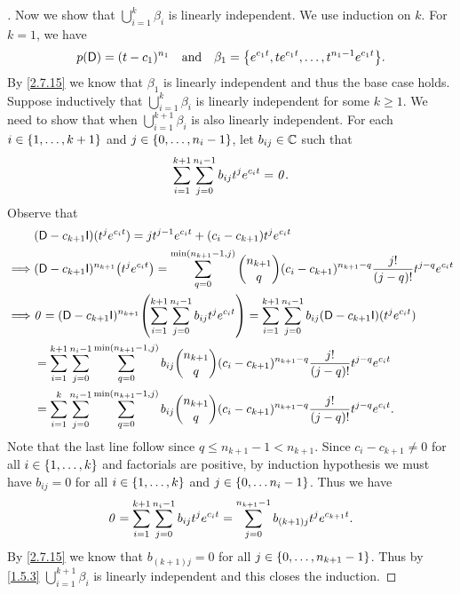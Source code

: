 \begin{proof}[]
	Now we show that \(\bigcup_{i = 1}^k \beta_i\) is linearly independent.
	We use induction on \(k\).
	For \(k = 1\), we have
	\[
		p(\Dop) = (t - c_1)^{n_1} \quad \text{and} \quad \beta_1 = \set{e^{c_1 t}, t e^{c_1 t}, \dots, t^{n_1 - 1} e^{c_1 t}}.
	\]
	By \cref{2.7.15} we know that \(\beta_1\) is linearly independent and thus the base case holds.
	Suppose inductively that \(\bigcup_{i = 1}^k \beta_i\) is linearly independent for some \(k \geq 1\).
	We need to show that when \(\bigcup_{i = 1}^{k + 1} \beta_i\) is also linearly independent.
	For each \(i \in \left\lbrace1, \dots, k + 1\right\rbrace\) and \(j \in \left\lbrace0, \dots, n_i - 1\right\rbrace\), let \(b_{i j} \in \mathbb{C}\) such that
	\[
		\sum_{i = 1}^{k + 1} \sum_{j = 0}^{n_i - 1} b_{i j} t^j e^{c_i t} = \mathit{0}.
	\]
	Observe that
	\begin{align*}
		         & (\Dop - c_{k + 1} \IT)(t^j e^{c_i t}) = j t^{j - 1} e^{c_i t} + (c_i - c_{k + 1}) t^j e^{c_i t}                                                                                                             \\
		\implies & (\Dop - c_{k + 1} \IT)^{n_{k + 1}} \pa{t^j e^{c_i t}} = \sum_{q = 0}^{\min(n_{k + 1} - 1, j)} \binom{n_{k + 1}}{q} (c_i - c_{k + 1})^{n_{k + 1} - q} \frac{j!}{(j - q)!} t^{j - q} e^{c_i t}                \\
		\implies & \zv = (\Dop - c_{k + 1} \IT)^{n_{k + 1}} \pa{\sum_{i = 1}^{k + 1} \sum_{j = 0}^{n_i - 1} b_{i j} t^j e^{c_i t}} = \sum_{i = 1}^{k + 1} \sum_{j = 0}^{n_i - 1} b_{i j} (\Dop - c_{k + 1} \IT)(t^j e^{c_i t}) \\
		         & = \sum_{i = 1}^{k + 1} \sum_{j = 0}^{n_i - 1} \sum_{q = 0}^{\min(n_{k + 1} - 1, j)} b_{i j} \binom{n_{k + 1}}{q} (c_i - c_{k + 1})^{n_{k + 1} - q} \frac{j!}{(j - q)!} t^{j - q} e^{c_i t}                  \\
		         & = \sum_{i = 1}^k \sum_{j = 0}^{n_i - 1} \sum_{q = 0}^{\min(n_{k + 1} - 1, j)} b_{i j} \binom{n_{k + 1}}{q} (c_i - c_{k + 1})^{n_{k + 1} - q} \frac{j!}{(j - q)!} t^{j - q} e^{c_i t}.
	\end{align*}
	Note that the last line follow since \(q \leq n_{k + 1} - 1 < n_{k + 1}\).
	Since \(c_i - c_{k + 1} \neq 0\) for all \(i \in \left\lbrace1, \dots, k\right\rbrace\) and factorials are positive, by induction hypothesis we must have \(b_{i j} = 0\) for all \(i \in \left\lbrace1, \dots, k\right\rbrace\) and \(j \in \left\lbrace0, \dots n_i - 1\right\rbrace\).
	Thus we have
	\[
		\mathit{0} = \sum_{i = 1}^{k + 1} \sum_{j = 0}^{n_i - 1} b_{i j} t^j e^{c_i t} = \sum_{j = 0}^{n_{k + 1} - 1} b_{(k + 1) j} t^j e^{c_{k + 1} t}.
	\]
	By \cref{2.7.15} we know that \(b_{(k + 1) j} = 0\) for all \(j \in \left\lbrace0, \dots, n_{k + 1} - 1\right\rbrace\).
	Thus by \cref{1.5.3} \(\bigcup_{i = 1}^{k + 1} \beta_i\) is linearly independent and this closes the induction.
\end{proof}

